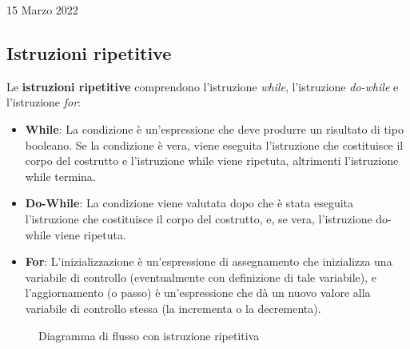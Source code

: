 \documentclass[a4paper]{extarticle}
\begin{document}
\newpage
\noindent
\begin{center}
  15 Marzo 2022
\end{center}
\subsection{Istruzioni ripetitive}
Le \textbf{istruzioni ripetitive} comprendono l’istruzione \emph{while}, l’istruzione \emph{do-while} e l’istruzione \emph{for}:
\begin{itemize}
  \item \textbf{While}: La condizione è un’espressione che deve produrre un risultato di tipo booleano. Se la condizione è vera, viene eseguita l’istruzione che costituisce il corpo del costrutto e l’istruzione while viene ripetuta, altrimenti l’istruzione while termina.

  \item \textbf{Do-While}: La condizione viene valutata dopo che è stata eseguita l’istruzione che costituisce il corpo del costrutto, e, se vera, l’istruzione do-while viene ripetuta.

  \item \textbf{For}: L'inizializzazione è un’espressione di assegnamento che inizializza una variabile di controllo (eventualmente con definizione di tale variabile), e l’aggiornamento (o passo) è un’espressione che dà un nuovo valore alla variabile di controllo stessa (la incrementa o la decrementa).
\end{itemize}

\begin{figure}[H]
  \centering
  \caption{Diagramma di flusso con istruzione ripetitiva}
  \label{fig:diagramma_flusso_istruzione_ripetitiva}
\end{figure}
\end{document}
